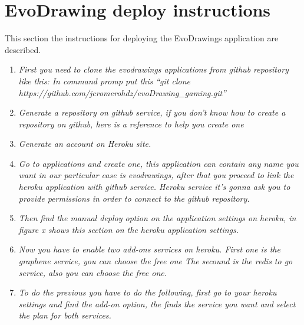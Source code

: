 \chapter{EvoDrawing deploy instructions}\label{apendixa}

This section the instructions for deploying the EvoDrawings application are described.

\begin{enumerate}
\item \textit{First you need to clone the evodrawings
applications from github repository like this: In command promp put this “git
clone https://github.com/jcromerohdz/evoDrawing_gaming.git” }

\item \textit{
Generate a repository on github service, if you don’t know how to create a
repository on github, here is a reference to help you create one \cite{}}

\item\textit{Generate an account on Heroku site.}

\item \textit{Go to applications and create one, this application can contain
any name you want in our particular case is evodrawings, after that you proceed
to link the heroku application with github service. Heroku service it’s gonna
ask you to provide permissions in order to connect to the github repository.}

\item \textit{Then find the manual deploy option on the application settings on
heroku, in figure x shows this section on the heroku application settings.}

\item \textit{Now you have to enable two add-ons services on heroku.
First one is the graphene service, you can choose the free one
The secound is the redis to go service, also you can choose the free one.}

\item \textit{To do the previous you have to do the following, first go to your heroku
settings and find the add-on option, the finds the service you want and select
the plan for both services.}





\end{enumerate}
